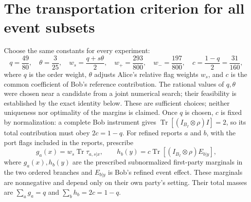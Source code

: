 \documentclass[11pt]{article}
\newcommand{\Tr}{\operatorname{Tr}}
\begin{document}
\section{The transportation criterion for all event subsets}
Choose the same constants for every experiment:
\begin{equation}
 q=\frac{49}{80},\quad\theta=\frac3{25},\quad
 w_s=\frac{q+s\theta}{2},\quad
 w_+=\frac{293}{800},\quad w_-=\frac{197}{800},\quad
 c=\frac{1-q}{2}=\frac{31}{160},
 \label{eq:margins}
\end{equation}
where $q$ is the order weight, $\theta$ adjusts Alice's relative flag weights $w_s$, and $c$ is the common coefficient of Bob's reference contribution. The rational values of $q,\theta$ were chosen near a candidate from a joint numerical search; their feasibility is established by the exact identity below. These are sufficient choices; neither uniqueness nor optimality of the margins is claimed. Once $q$ is chosen, $c$ is fixed by normalization: a complete Bob instrument gives $\Tr[(I_{B_I}\otimes\rho)I]=2$, so its total contribution must obey $2c=1-q$. For refined reports $a$ and $b$, with the port flags included in the reports, prescribe
\begin{equation}
 g_a(x)=w_s\Tr\tau_{a,s|x},\qquad
 h_b(y)=c\Tr[(I_{B_I}\otimes\rho)E_{b|y}],
 \label{eq:prescribed-margins}
\end{equation}
where $g_a(x),h_b(y)$ are the prescribed subnormalized first-party marginals in the two ordered branches and $E_{b|y}$ is Bob's refined event effect. These marginals are nonnegative and depend only on their own party's setting. Their total masses are $\sum_a g_a=q$ and $\sum_b h_b=2c=1-q$.
\end{document}
